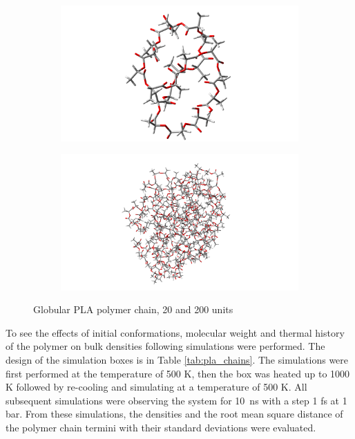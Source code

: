 \begin{figure}[htb]
	\begin{subfigure}{0.5\textwidth}
		\includegraphics[width=0.9\linewidth]{img/pla_10g_tube.png} 
	\end{subfigure}
	\begin{subfigure}{0.5\textwidth}
		\includegraphics[width=0.9\linewidth]{img/pla_100g_tube.png} 
	\end{subfigure}   	
	\caption{Globular PLA polymer chain, 20 and 200 units}
	\label{fig:sbalene}
\end{figure}\vspace{-0.2cm}

To see the effects of initial conformations, molecular weight and thermal history of the polymer on bulk densities following simulations were performed. The design of the simulation boxes is in Table \ref{tab:pla_chains}. The simulations were first performed at the temperature of 500 K, then the box was heated up to 1000 K followed by re-cooling and simulating at a temperature of 500 K. All subsequent simulations were observing the system for 10~ns with a step 1 fs at 1 bar. From these simulations, the densities and the root mean square distance of the polymer chain termini with their standard deviations were evaluated.

